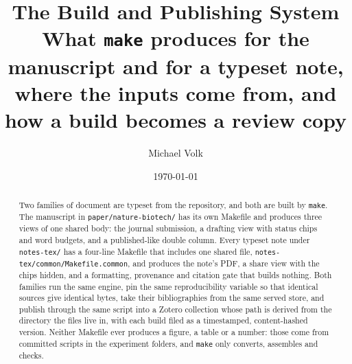 \documentclass[10pt,a4paper]{article}
\title{\vspace{-1.5em}The Build and Publishing System\\
  {\large What \texttt{make} produces for the manuscript and for a typeset note,
   where the inputs come from, and how a build becomes a review copy}}
\author{Michael Volk}
\date{\today}
\begin{document}
\maketitle
\thispagestyle{empty}

\begin{abstract}
\noindent
Two families of document are typeset from the repository, and both are built by
\texttt{make}. The manuscript in \texttt{paper/nature-biotech/} has its own
Makefile and produces three views of one shared body: the journal submission, a
drafting view with status chips and word budgets, and a published-like double
column. Every typeset note under \texttt{notes-tex/} has a four-line Makefile that
includes one shared file, \texttt{notes-tex/common/Makefile.common}, and produces
the note's PDF, a share view with the chips hidden, and a formatting, provenance
and citation gate that builds nothing. Both families run the same engine, pin the
same reproducibility variable so that identical sources give identical bytes, take
their bibliographies from the same served store, and publish through the same
script into a Zotero collection whose path is derived from the directory the files
live in, with each build filed as a timestamped, content-hashed version. Neither
Makefile ever produces a figure, a table or a number: those come from committed
scripts in the experiment folders, and \texttt{make} only converts, assembles and
checks.
\end{abstract}

\vspace{0.5em}
\tccontents
\clearpage








\end{document}

